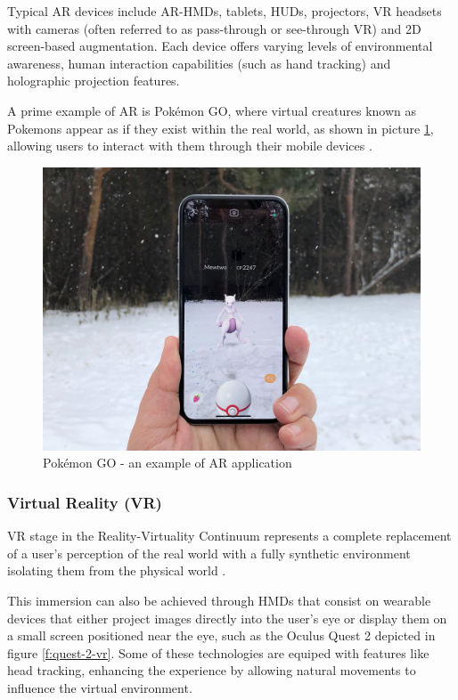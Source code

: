    Typical \ac{AR} devices include \ac{AR}-\ac{HMDs}, tablets, \ac{HUDs}, projectors, \ac{VR} headsets with cameras (often referred to as pass-through or see-through VR) and 2D screen-based augmentation. Each device offers varying levels of environmental awareness, human interaction capabilities (such as hand tracking) and holographic projection features.


    A prime example of \ac{AR} is Pokémon GO, where virtual creatures known as Pokemons appear as if they exist within the real world, as shown in picture
    \ref{f:pokemon-go}, allowing users to interact with them through their mobile devices \cite{whatismixedreality}.

    \begin{figure}[h]
        \centering
        \includegraphics[width=0.6\linewidth]{figs/mewtwo.jpg}
        \caption{Pokémon GO - an example of \ac{AR} application}
        \label{f:pokemon-go}
    \end{figure}


\subsubsection{Virtual Reality (\ac{VR})}
    
    \ac{VR} stage in the Reality-Virtuality Continuum represents a complete replacement of a user’s perception of the real world with a fully synthetic environment isolating them from the physical world \cite{milgram1994}.

    This immersion can also be achieved through \ac{HMDs} that consist on wearable devices that either project images directly into the user's eye or display them on a small screen positioned near the eye, such as the Oculus Quest 2 depicted in figure \ref{f:quest-2-vr}. 
    Some of these technologies are equiped with features like head tracking, enhancing the experience by allowing natural movements to influence the virtual environment.
    
